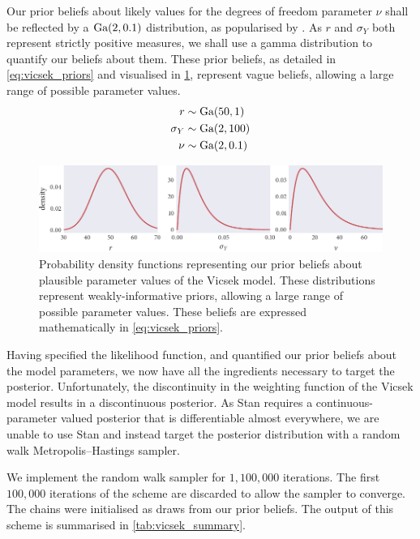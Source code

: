 Our prior beliefs about likely values for the degrees of freedom parameter
$\nu$ shall be reflected by a $\textrm{Ga}(2, 0.1)$ distribution, as popularised by
\textcite{juarez10}. As $r$ and $\sigma_Y$ both represent strictly positive
measures, we shall use a gamma distribution to quantify our beliefs about them.
These prior beliefs, as detailed in \cref{eq:vicsek_priors} and visualised in
\cref{fig:vicsek_priors}, represent vague beliefs, allowing a large range of
possible parameter values.
\begin{align}
  \label{eq:vicsek_priors}
  \begin{split}
    r           & \sim \textrm{Ga}(50, 1) \\
    \sigma_Y    & \sim \textrm{Ga}(2, 100)\\
    \nu         & \sim \textrm{Ga}(2, 0.1)
  \end{split}
\end{align}
\begin{figure}[tbp]
  \includegraphics{r_priors.pdf}
  \caption{Probability density functions representing our prior beliefs about
      plausible parameter values of the Vicsek model. These distributions
      represent weakly-informative priors, allowing a large range of possible
      parameter values. These beliefs are expressed mathematically in
  \cref{eq:vicsek_priors}.}
  \label{fig:vicsek_priors}
\end{figure}

Having specified the likelihood function, and quantified our prior beliefs
about the model parameters, we now have all the ingredients necessary to target
the posterior. Unfortunately, the discontinuity in the weighting function of
the Vicsek model results in a discontinuous posterior. As Stan requires a
continuous-parameter valued posterior that is differentiable almost everywhere,
we are unable to use Stan and instead target the posterior distribution with a
random walk Metropolis--Hastings sampler.

We implement the random walk sampler for $1,100,000$ iterations. The first
$100,000$ iterations of the scheme are discarded to allow the sampler to
converge. The chains were initialised as draws from our prior beliefs. The
output of this scheme is summarised in
\cref{tab:vicsek_summary}.

